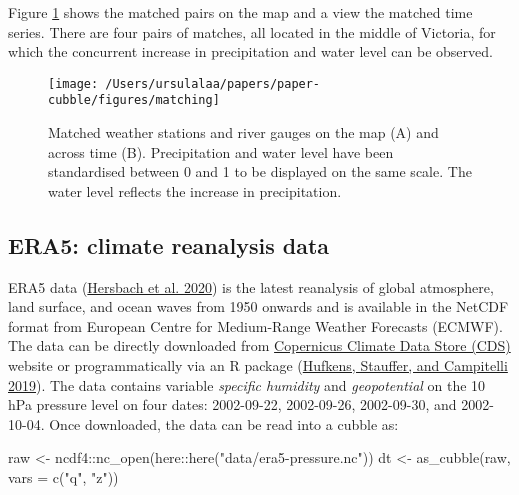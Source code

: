 \documentclass{article}
\newenvironment{Shaded}{\begin{snugshade}}{\end{snugshade}}
\newcommand{\AttributeTok}[1]{\textcolor[rgb]{0.77,0.63,0.00}{#1}}
\newcommand{\FunctionTok}[1]{\textcolor[rgb]{0.00,0.00,0.00}{#1}}
\newcommand{\NormalTok}[1]{#1}
\newcommand{\OtherTok}[1]{\textcolor[rgb]{0.56,0.35,0.01}{#1}}
\newcommand{\SpecialCharTok}[1]{\textcolor[rgb]{0.00,0.00,0.00}{#1}}
\newcommand{\StringTok}[1]{\textcolor[rgb]{0.31,0.60,0.02}{#1}}
\begin{document}
Figure \ref{fig:matching} shows the matched pairs on the map and a view the matched time series. There are four pairs of matches, all located in the middle of Victoria, for which the concurrent increase in precipitation and water level can be observed.

\begin{figure}
\texttt{[image: /Users/ursulalaa/papers/paper-cubble/figures/matching]} \caption{Matched weather stations and river gauges on the map (A) and across time (B). Precipitation and water level have been standardised between 0 and 1 to be displayed on the same scale. The water level reflects the increase in precipitation.}\label{fig:matching}
\end{figure}

\hypertarget{era5-climate-reanalysis-data}{%
\subsection{ERA5: climate reanalysis data}\label{era5-climate-reanalysis-data}}

ERA5 data (\protect\hyperlink{ref-hersbach2020era5}{Hersbach et al. 2020}) is the latest reanalysis of global atmosphere, land surface, and ocean waves from 1950 onwards and is available in the NetCDF format from European Centre for Medium-Range Weather Forecasts (ECMWF). The data can be directly downloaded from \href{https://cds.climate.copernicus.eu/cdsapp\#!/dataset/reanalysis-era5-pressure-levels?tab=overview}{Copernicus Climate Data Store (CDS)} website or programmatically via an R package  (\protect\hyperlink{ref-ecwmfr}{Hufkens, Stauffer, and Campitelli 2019}). The  data contains variable \emph{specific humidity} and \emph{geopotential} on the 10 hPa pressure level on four dates: 2002-09-22, 2002-09-26, 2002-09-30, and 2002-10-04. Once downloaded, the data can be read into a cubble as:

\begin{Shaded}
\begin{Highlighting}[]
\NormalTok{raw }\OtherTok{\textless{}{-}}\NormalTok{ ncdf4}\SpecialCharTok{::}\FunctionTok{nc\_open}\NormalTok{(here}\SpecialCharTok{::}\FunctionTok{here}\NormalTok{(}\StringTok{"data/era5{-}pressure.nc"}\NormalTok{))}
\NormalTok{dt }\OtherTok{\textless{}{-}} \FunctionTok{as\_cubble}\NormalTok{(raw, }\AttributeTok{vars =} \FunctionTok{c}\NormalTok{(}\StringTok{"q"}\NormalTok{, }\StringTok{"z"}\NormalTok{))}
\end{Highlighting}
\end{Shaded}
\end{document}
